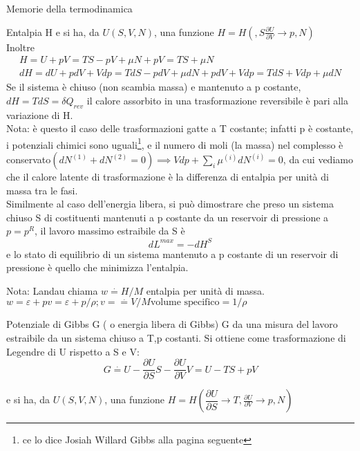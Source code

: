 \documentclass[a4paper,11pt]{report}
\newcommand{\defeq}{\overset{\cdot}{=}}
\begin{document}
\begin{chapter}{Memorie della termodinamica}
\begin{section}{Entalpia H}
			e si ha, da $U(S,V,N)$, una funzione $H = H(,S\frac{\partial U}{\partial V} \rightarrow p,N)$\\
			
			Inoltre 
			\begin{equation}
				\begin{aligned}
				H = U + pV = TS -pV +\mu N + pV = TS + \mu N \\
			 	dH = dU +pdV + Vdp = TdS - pdV + \mu dN + pdV + Vdp = TdS + Vdp + \mu dN
				\end{aligned}
			\end{equation}
			Se il sistema è chiuso (non scambia massa) e mantenuto a p costante, $dH = TdS = \delta Q_{rev}$ il calore assorbito in una trasformazione reversibile è pari alla variazione di H.\\
			
			Nota: è questo il caso delle trasformazioni gatte a T costante; infatti p è costante, i potenziali chimici sono uguali\footnote{ce lo dice Josiah Willard Gibbs alla pagina seguente}, e il numero di moli (la massa) nel complesso è conservato$(dN^{(1)} + dN^{(2)} = 0) \implies Vdp + \sum_i \mu^{(i)} dN^{(i)} = 0$, da cui vediamo che il calore latente di trasformazione è la differenza di entalpia per unità di massa tra le fasi.\\
			Similmente al caso dell'energia libera, si può dimostrare che preso un sistema chiuso S di costituenti mantenuti a p costante da un reservoir di pressione a $p=p^R$, il lavoro massimo estraibile da S è 
			$$
			dL^{max} = -dH^S
			$$
			e lo stato di equilibrio di un sistema mantenuto a p costante di un reservoir di pressione è quello che minimizza l'entalpia.
			
			Nota: Landau chiama $w \overset{\cdot}{=} H/M$ entalpia per unità di massa. $w = \varepsilon + pv = \varepsilon + p/\rho; v = \overset{\cdot}{=} V/M \textrm{volume specifico} = 1/\rho$
		\end{section}
	\begin{section}{Potenziale di Gibbs G ( o energia libera di Gibbs)}
		G da una misura del lavoro estraibile da un sistema chiuso a T,p costanti. Si ottiene come trasformazione di Legendre di U rispetto a S e V:
		$$
		G \defeq U - \dfrac{\partial U}{\partial S}S - \dfrac{\partial U}{\partial V}V = U -TS + pV
		$$
		
		e si ha, da $U(S,V,N)$, una funzione $H = H(\dfrac{\partial U}{\partial S}\rightarrow T,\frac{\partial U}{\partial V} \rightarrow p,N)$\\ 
		

\end{section}
\end{chapter}
\end{document}
